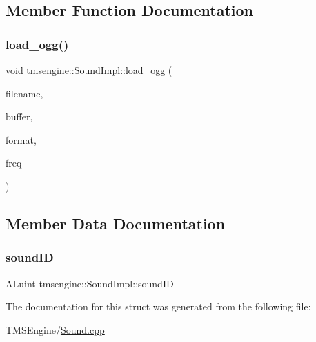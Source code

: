 \subsection{Member Function Documentation}
\mbox{\label{structtmsengine_1_1_sound_impl_a1995d7987e588d66baa614381d0613da}} 
\subsubsection{\texorpdfstring{load\+\_\+ogg()}{load\_ogg()}}
{\footnotesize\ttfamily void tmsengine\+::\+Sound\+Impl\+::load\+\_\+ogg (\begin{DoxyParamCaption}\item[{std\+::string}]{filename,  }\item[{std\+::vector$<$ char $>$ \&}]{buffer,  }\item[{A\+Lenum \&}]{format,  }\item[{A\+Lsizei \&}]{freq }\end{DoxyParamCaption})\hspace{0.3cm}{\ttfamily [inline]}}



\subsection{Member Data Documentation}
\mbox{\label{structtmsengine_1_1_sound_impl_a2d9069b4af77273e7bfe07f063486244}} 
\subsubsection{\texorpdfstring{sound\+ID}{soundID}}
{\footnotesize\ttfamily A\+Luint tmsengine\+::\+Sound\+Impl\+::sound\+ID}



The documentation for this struct was generated from the following file\+:\begin{DoxyCompactItemize}
\item 
T\+M\+S\+Engine/\hyperlink{_sound_8cpp}{Sound.\+cpp}\end{DoxyCompactItemize}
